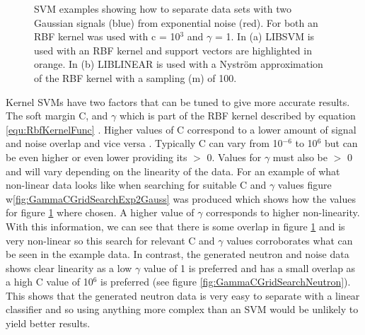 \begin{figure}[!h]
\begin{subfigure}{.5\textwidth}
  \captionsetup{width=.9\linewidth}
  \caption{}
  \label{subFig:exp_2NysGaussExample}
\end{subfigure}
\caption{SVM examples showing how to separate data sets with two Gaussian signals (blue) from exponential noise (red). For both an RBF kernel was used with c = 10$^3$ and $\gamma$ = 1. In (a) LIBSVM is used with an RBF kernel and support vectors are highlighted in orange. In (b) LIBLINEAR is used with a Nyström approximation of the RBF kernel with a sampling (m) of 100.}
\label{fig:svmExp_GausseExamples}
\end{figure}

Kernel SVMs have two factors that can be tuned to give more accurate results. The soft margin C, and $\gamma$ which is part of the RBF kernel described by equation \ref{equ:RbfKernelFunc} \cite{Boser92atraining}. Higher values of C correspond to a lower amount of signal and noise overlap and vice versa \cite{cortes1995support}. Typically C can vary from 10$^{-6}$ to 10$^6$ but can be even higher or even lower providing its $>$ 0. Values for $\gamma$ must also be $>$ 0 and will vary depending on the linearity of the data. For an example of what non-linear data looks like when searching for suitable C and $\gamma$ values figure w\ref{fig:GammaCGridSearchExp2Gauss} was produced which shows how the values for figure \ref{subFig:exp_2NysGaussExample} where chosen. A higher value of $\gamma$ corresponds to higher non-linearity. With this information, we can see that there is some overlap in figure \ref{subFig:exp_2NysGaussExample} and is very non-linear so this search for relevant C and $\gamma$ values corroborates what can be seen in the example data. In contrast, the generated neutron and noise data shows clear linearity as a low $\gamma$ value of 1 is preferred and has a small overlap as a high C value of 10$^6$ is preferred (see figure \ref{fig:GammaCGridSearchNeutron}). This shows that the generated neutron data is very easy to separate with a linear classifier and so using anything more complex than an SVM would be unlikely to yield better results.

